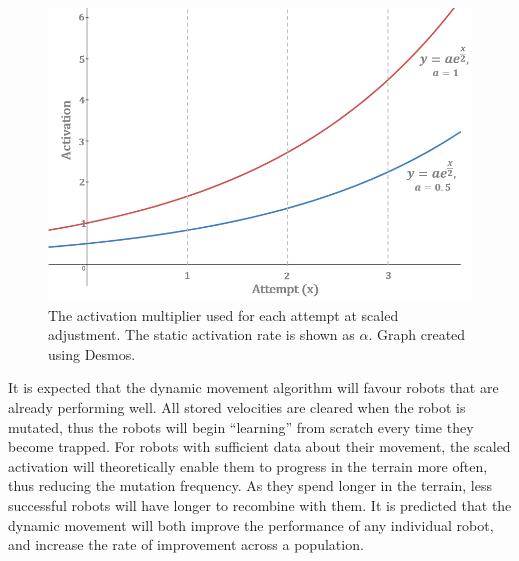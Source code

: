 \documentclass{article}
\begin{document}
\begin{enumerate}
\begin{figure}[H]
\centering
\includegraphics[scale=0.8]{activationFunction}
\caption{The activation multiplier used for each attempt at scaled adjustment. The static activation rate is shown as $\alpha$. Graph created using Desmos. \citep{graphs}}
\end{figure}
\end{enumerate}

It is expected that the dynamic movement algorithm will favour robots that are already performing well. All stored velocities are cleared when the robot is mutated, thus the robots will begin “learning” from scratch every time they become trapped. For robots with sufficient data about their movement, the scaled activation will theoretically enable them to progress in the terrain more often, thus reducing the mutation frequency. As they spend longer in the terrain, less successful robots will have longer to recombine with them. It is predicted that the dynamic movement will both improve the performance of any individual robot, and increase the rate of improvement across a population. \\
\end{document}
